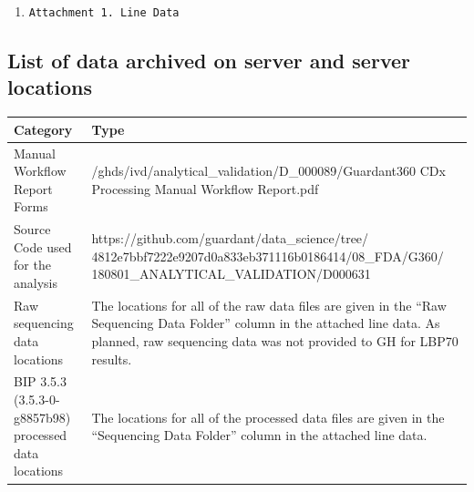 \documentclass[12pt]{protocol}
\begin{document}
\begin{enumerate}
    \item \texttt{Attachment 1. Line Data} 
\end{enumerate}
\newpage %


\begin{appendices}
\renewcommand{\thesection}{\arabic{section}} 

\section{List of data archived on server and server locations}
\label{a:List_of_data_archived_on_server_and_server_locations}

\begin{tabular}{|L{2in}|L{5.4in}|}
    \hline
     \textbf{Category} & \textbf{Type} \\ \hline
    Manual Workflow Report Forms & /ghds/ivd/analytical\_validation/D\_000089/Guardant360 CDx Processing Manual Workflow Report.pdf \\ \hline 
    Source Code used for the analysis & https://github.com/guardant/data\_science/tree/
    4812e7bbf7222e9207d0a833eb371116b0186414/08\_FDA/G360/ 180801\_ANALYTICAL\_VALIDATION/D000631 \\ \hline
    Raw sequencing data locations & The locations for 
    all of the raw data files are given in the ``Raw Sequencing Data Folder''
    column in the attached line data. As planned, raw sequencing data was not
    provided to GH for LBP70 results. \\ \hline
    BIP 3.5.3 (3.5.3-0-g8857b98) processed data locations & The locations for 
    all of the processed data files are given in the ``Sequencing Data Folder''
    column in the attached line data. \\ \hline
\end{tabular}
\clearpage



\end{appendices}
\end{document}
